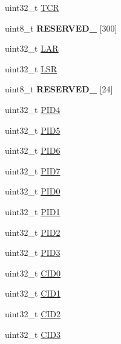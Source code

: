 \begin{DoxyCompactItemize}
\item 
uint32\+\_\+t \hyperlink{struct_i_t_m___mem_map_a9dceb31807fae649d751a78f490383d8}{T\+C\+R}
\item 
\hypertarget{struct_i_t_m___mem_map_a6f05fb189ab70c58f1e831f0421b6e3e}{}uint8\+\_\+t {\bfseries R\+E\+S\+E\+R\+V\+E\+D\+\_} \mbox{[}300\mbox{]}\label{struct_i_t_m___mem_map_a6f05fb189ab70c58f1e831f0421b6e3e}

\item 
uint32\+\_\+t \hyperlink{struct_i_t_m___mem_map_af3f0dfff8c586620bdb0026aca56fe05}{L\+A\+R}
\item 
uint32\+\_\+t \hyperlink{struct_i_t_m___mem_map_a8ecbf568728eeaac07edd3774a4dbd9f}{L\+S\+R}
\item 
\hypertarget{struct_i_t_m___mem_map_a1ada0cb3e760f97966359cef3564e25f}{}uint8\+\_\+t {\bfseries R\+E\+S\+E\+R\+V\+E\+D\+\_} \mbox{[}24\mbox{]}\label{struct_i_t_m___mem_map_a1ada0cb3e760f97966359cef3564e25f}

\item 
uint32\+\_\+t \hyperlink{struct_i_t_m___mem_map_ab25032ed174621fec16ce7f0b797e251}{P\+I\+D4}
\item 
uint32\+\_\+t \hyperlink{struct_i_t_m___mem_map_a44b9d410c8989eb78aa4ea68a32e4bc5}{P\+I\+D5}
\item 
uint32\+\_\+t \hyperlink{struct_i_t_m___mem_map_ab3ff032be95ac6f7ed1148ad6df2898b}{P\+I\+D6}
\item 
uint32\+\_\+t \hyperlink{struct_i_t_m___mem_map_ab5d680cdaa89677231777f60835b9b1b}{P\+I\+D7}
\item 
uint32\+\_\+t \hyperlink{struct_i_t_m___mem_map_a33d99fb4c1d69a6ca62e0e3442f07a95}{P\+I\+D0}
\item 
uint32\+\_\+t \hyperlink{struct_i_t_m___mem_map_a7de8ee5b7f467a00ac6c7290c93b39a8}{P\+I\+D1}
\item 
uint32\+\_\+t \hyperlink{struct_i_t_m___mem_map_a3741dc3de5146a9df958acae0b2e0ea0}{P\+I\+D2}
\item 
uint32\+\_\+t \hyperlink{struct_i_t_m___mem_map_a224feb863e1cd18dcb71e8da810f9d61}{P\+I\+D3}
\item 
uint32\+\_\+t \hyperlink{struct_i_t_m___mem_map_aa106970486025d57f6bd43ce99ce1b2a}{C\+I\+D0}
\item 
uint32\+\_\+t \hyperlink{struct_i_t_m___mem_map_ac41c2c8d78aa8c7bf579da2e2b587a76}{C\+I\+D1}
\item 
uint32\+\_\+t \hyperlink{struct_i_t_m___mem_map_a5048e832d89ab50cad8978e9169bcb9d}{C\+I\+D2}
\item 
uint32\+\_\+t \hyperlink{struct_i_t_m___mem_map_a0cd6f004d85bdf3734763af74927cd2f}{C\+I\+D3}
\end{DoxyCompactItemize}


